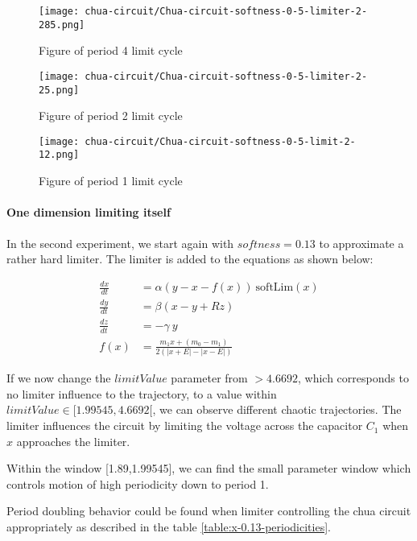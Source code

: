 \documentclass[main]{subfiles}
\begin{document}
\begin{figure}[H]
\centering
\texttt{[image: chua-circuit/Chua-circuit-softness-0-5-limiter-2-285.png]}
\caption[Figure of period 4 limit cycle]{Figure of period 4 limit cycle}
\label{figure:chaotictrajectories}
\end{figure}

\begin{figure}[H]
\centering
\texttt{[image: chua-circuit/Chua-circuit-softness-0-5-limiter-2-25.png]}
\caption[Figure of period 3 limit cycle]{Figure of period 2 limit cycle}
\label{figure:chaotictrajectories}
\end{figure}

\begin{figure}[H]
\centering
\texttt{[image: chua-circuit/Chua-circuit-softness-0-5-limit-2-12.png]}
\caption[Figure of period 1 limit cycle]{Figure of period 1 limit cycle}
\label{figure:chaotictrajectories}
\end{figure}

\paragraph{One dimension limiting itself} In the second experiment, we start again with \(softness=0.13\) to approximate a rather hard limiter. The limiter is added to the equations as shown below:

\begin{align*}
\frac{dx}{dt}&=\alpha (y-x-f(x)) ~ \text{softLim}(x)\\
\frac{dy}{dt}&=\beta (x-y + Rz)\\
\frac{dz}{dt}&=-\gamma ~ y\\
f (x) &= \frac{m_1 x + (m_0 - m_1)}{2 (| x + E | -| x - E |)}
\end{align*}

If we now change the $limitValue$ parameter from \(>4.6692\), which corresponds to no limiter influence to the trajectory, to a value within \(limitValue \in [1.99545,4.6692[\), we can observe different chaotic trajectories. The limiter influences the circuit by limiting the voltage across the capacitor \(C_1\) when \(x\) approaches the limiter.

Within the window [1.89,1.99545], we can find the small parameter window which controls motion of high periodicity down to period 1.

Period doubling behavior could be found when limiter controlling the chua circuit appropriately as described in the table \ref{table:x-0.13-periodicities}.
\end{document}
